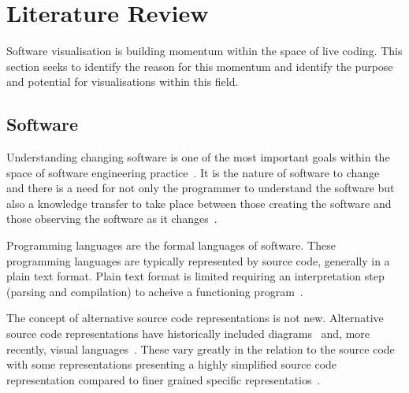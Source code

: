 
\chapter{Literature Review}

Software visualisation is building momentum within the space of live coding. This section seeks to identify the reason for this momentum and identify the purpose and potential for visualisations within this field.


\section{Software}

Understanding changing software is one of the most important goals within the space of software engineering practice~\cite{Tao2012}. It is the nature of software to change~\cite{Purushothaman2005} and there is a need for not only the programmer to understand the software but also a knowledge transfer to take place between those creating the software and those observing the software as it changes~.

Programming languages are the formal languages of software. These programming languages are typically represented by source code, generally in a plain text format. Plain text format is limited requiring an interpretation step (parsing and compilation) to acheive a functioning program~\cite{Badros2000}.

The concept of alternative source code representations is not new. Alternative source code representations have historically included diagrams~ and, more recently, visual languages~. These vary greatly in the relation to the source code with some representations presenting a highly simplified source code representation compared to finer grained specific representatios~.

